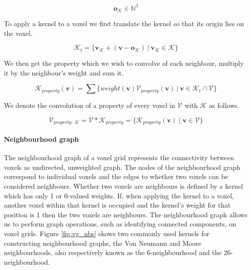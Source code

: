 \begin{equation}
\boldsymbol{o}_{\mathcal{K}} \in \mathbb{N}^{3}
\end{equation}

To apply a kernel to a voxel we first translate the kernel so that its origin lies on the voxel.

\begin{equation}
    \label{eq:kv}
\mathcal{K}_t = \{\boldsymbol{v_{\mathcal{K}}} + (\boldsymbol{v} - \boldsymbol{o_{\mathcal{K}}})\ |\ \boldsymbol{v_{\mathcal{K}}} \in \mathcal{K}\}
\end{equation}

We then get the property which we wish to convolve of each neighbour, multiply it by the neighbour's weight and sum it.

\begin{equation}
    \label{eq:kw}
    \mathcal{K}_{property}(\boldsymbol{v}) = \sum \{weight(\boldsymbol{v})\mathcal{V}_{property}(\boldsymbol{v})\ |\ \boldsymbol{v} \in \mathcal{K}_{t} \cap \mathcal{V}\}
\end{equation}

We denote the convolution of a property of every voxel in \(\mathcal{V}\) with \(\mathcal{K}\) as follows.

\begin{equation}
    \label{eq:c}
    \mathcal{V}_{property,\  \mathcal{K}} = \mathcal{V} * \mathcal{K}_{property} = \{\mathcal{K}_{property}(\boldsymbol{v}) \mid \boldsymbol{v} \in \mathcal{V}\}
\end{equation}


\paragraph{Neighbourhood graph}

The neighbourhood graph of a voxel grid represents the connectivity between voxels as undirected, unweighted graph. The nodes of the neighbourhood graph correspond to individual voxels and the edges to whether two voxels can be considered neighbours. Whether two voxels are neighbours is defined by a kernel which has only 1 or 0-valued weights. If, when applying the kernel to a voxel, another voxel within that kernel is occupied and the kernel's weight for that position is 1 then the two voxels are neighbours. The neighbourhood graph allows us to perform graph operations, such as identifying connected components, on voxel grids. Figure \ref{fig:vg_nbs} shows two commonly used kernels for constructing neighbourhood graphs, the Von Neumann and Moore neighbourhoods, also respectively known as the 6-neighbourhood and the 26-neighbourhood.


